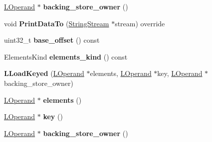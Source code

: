 \begin{DoxyCompactItemize}
\item 
\hyperlink{classv8_1_1internal_1_1_l_operand}{L\+Operand} $\ast$ {\bfseries backing\+\_\+store\+\_\+owner} ()\hypertarget{classv8_1_1internal_1_1_l_load_keyed_abaa0161e1ba4f83060c3bdd5bcf52c44}{}\label{classv8_1_1internal_1_1_l_load_keyed_abaa0161e1ba4f83060c3bdd5bcf52c44}

\item 
void {\bfseries Print\+Data\+To} (\hyperlink{classv8_1_1internal_1_1_string_stream}{String\+Stream} $\ast$stream) override\hypertarget{classv8_1_1internal_1_1_l_load_keyed_ab79d974cf88e1e1dbd886b24f0ff1984}{}\label{classv8_1_1internal_1_1_l_load_keyed_ab79d974cf88e1e1dbd886b24f0ff1984}

\item 
uint32\+\_\+t {\bfseries base\+\_\+offset} () const \hypertarget{classv8_1_1internal_1_1_l_load_keyed_a944c93975338d43236e1a696b686f4a4}{}\label{classv8_1_1internal_1_1_l_load_keyed_a944c93975338d43236e1a696b686f4a4}

\item 
Elements\+Kind {\bfseries elements\+\_\+kind} () const \hypertarget{classv8_1_1internal_1_1_l_load_keyed_a59cb1eff8d46bdb1d5d5c59aec4e9f47}{}\label{classv8_1_1internal_1_1_l_load_keyed_a59cb1eff8d46bdb1d5d5c59aec4e9f47}

\item 
{\bfseries L\+Load\+Keyed} (\hyperlink{classv8_1_1internal_1_1_l_operand}{L\+Operand} $\ast$elements, \hyperlink{classv8_1_1internal_1_1_l_operand}{L\+Operand} $\ast$key, \hyperlink{classv8_1_1internal_1_1_l_operand}{L\+Operand} $\ast$backing\+\_\+store\+\_\+owner)\hypertarget{classv8_1_1internal_1_1_l_load_keyed_ad304d9ea6496224e4a11a6cae2ee335b}{}\label{classv8_1_1internal_1_1_l_load_keyed_ad304d9ea6496224e4a11a6cae2ee335b}

\item 
\hyperlink{classv8_1_1internal_1_1_l_operand}{L\+Operand} $\ast$ {\bfseries elements} ()\hypertarget{classv8_1_1internal_1_1_l_load_keyed_a2fdaa6ebcc228ac46d2a03cffd1468ea}{}\label{classv8_1_1internal_1_1_l_load_keyed_a2fdaa6ebcc228ac46d2a03cffd1468ea}

\item 
\hyperlink{classv8_1_1internal_1_1_l_operand}{L\+Operand} $\ast$ {\bfseries key} ()\hypertarget{classv8_1_1internal_1_1_l_load_keyed_aea9caf0333cbad4a04007bd93e0fb176}{}\label{classv8_1_1internal_1_1_l_load_keyed_aea9caf0333cbad4a04007bd93e0fb176}

\item 
\hyperlink{classv8_1_1internal_1_1_l_operand}{L\+Operand} $\ast$ {\bfseries backing\+\_\+store\+\_\+owner} ()\hypertarget{classv8_1_1internal_1_1_l_load_keyed_abaa0161e1ba4f83060c3bdd5bcf52c44}{}\label{classv8_1_1internal_1_1_l_load_keyed_abaa0161e1ba4f83060c3bdd5bcf52c44}


\end{DoxyCompactItemize}

